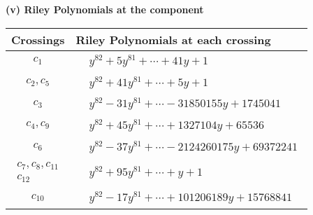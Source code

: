 \documentclass[1p]{elsarticle_modified}
\theoremstyle{definition}
\begin{document}
\newpage\renewcommand{\arraystretch}{1}
\flushleft \textbf{(v) Riley Polynomials at the component}\newline \\
\begin{tabular}{m{50pt}|m{274pt}}
Crossings & \hspace{64pt}Riley Polynomials at each crossing \\
\hline $$\begin{aligned}c_{1}\end{aligned}$$&$\begin{aligned}
&y^{82}+5 y^{81}+\cdots+41 y+1
\end{aligned}$\\
\hline $$\begin{aligned}c_{2},c_{5}\end{aligned}$$&$\begin{aligned}
&y^{82}+41 y^{81}+\cdots+5 y+1
\end{aligned}$\\
\hline $$\begin{aligned}c_{3}\end{aligned}$$&$\begin{aligned}
&y^{82}-31 y^{81}+\cdots-31850155 y+1745041
\end{aligned}$\\
\hline $$\begin{aligned}c_{4},c_{9}\end{aligned}$$&$\begin{aligned}
&y^{82}+45 y^{81}+\cdots+1327104 y+65536
\end{aligned}$\\
\hline $$\begin{aligned}c_{6}\end{aligned}$$&$\begin{aligned}
&y^{82}-37 y^{81}+\cdots-2124260175 y+69372241
\end{aligned}$\\
\hline $$\begin{aligned}c_{7},c_{8},c_{11}\\c_{12}\end{aligned}$$&$\begin{aligned}
&y^{82}+95 y^{81}+\cdots+y+1
\end{aligned}$\\
\hline $$\begin{aligned}c_{10}\end{aligned}$$&$\begin{aligned}
&y^{82}-17 y^{81}+\cdots+101206189 y+15768841
\end{aligned}$\\
\hline
\end{tabular}\\~\\
\end{document}
